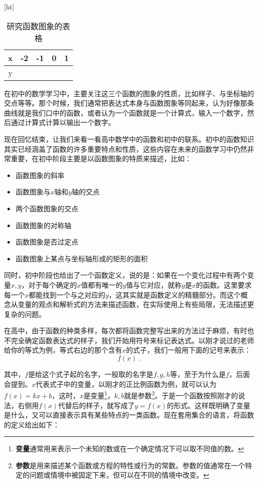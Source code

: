 \begin{table}\label{tab_functi_1}[ht]
\centering
\caption{研究函数图象的表格}\label{tab_functi1}
\begin{tabular}{|c|c|c|c|c|}
\hline
x & -2 & -1 & 0 & 1 \\
\hline
y &   &   &   &   \\
\hline
\end{tabular}
\end{table}

在初中的数学学习中，主要关注这三个函数的图象的性质，比如样子、与坐标轴的交点等等。那个时候，我们通常把表达式本身与函数图象等同起来，认为好像那条曲线就是我们口中的函数，或者认为一个函数就是一个计算式，输入一个数字，然后通过计算式计算以输出一个数字。

现在回忆结束，让我们来看一看高中数学中的函数和初中的联系。初中的函数知识其实已经涵盖了函数的许多重要特点和性质，这些内容在未来的函数学习中仍然非常重要，在初中阶段主要是以函数图象的特质来描述，比如：
\begin{itemize}
\item 函数图象的斜率
\item 函数图象与$x$轴和$y$轴的交点
\item 两个函数图象的交点
\item 函数图象的对称轴
\item 函数图象是否过定点
\item 函数图象上某点与坐标轴形成的矩形的面积
\end{itemize}

同时，初中阶段也给出了一个函数定义，说的是：如果在一个变化过程中有两个变量$x,y$，对于每个确定的$x$值都有唯一的$y$值与它对应，就称$y$是$x$的函数。这里要求每一个$x$都能找到一个与之对应的$y$，这其实就是函数定义的精髓部分。而这个概念从变量的观点和解析式的方法来描述函数，在实际使用上有些局限，无法描述更复杂的问题。

在高中，由于函数的种类多样，每次都将函数完整写出来的方法过于麻烦，有时也不完全确定函数表达式的样子，我们开始用符号来标记表达式。以刚才说过的老师给你的等式为例，等式右边的那个含有$x$的式子，我们一般用下面的记号来表示：
\begin{equation}
f(x)~.
\end{equation}

其中，$f$是给这个式子起的名字，一般取的名字是$f,g,h$等，至于为什么是$f$，后面会提到。$x$代表式子中的变量，以刚才的正比例函数为例，就可以认为$f(x)=kx+b$，这时，$x$是变量\footnote{\textbf{变量}通常用来表示一个未知的数或在一个确定情况下可以取不同值的数。}，$k,b$就是参数\footnote{\textbf{参数}是用来描述某个函数或方程的特性或行为的常数。参数的值通常在一个特定的问题或情境中被固定下来，但可以在不同的情境中改变。}。于是一个函数按照刚才的说法，右侧用$f(x)$代替后的样子，就写成了$y=f(x)$的形式。这样既明确了变量是什么，又可以直接表示具有某些特点的一类函数。现在套用集合的语言，将函数的定义给出如下：

